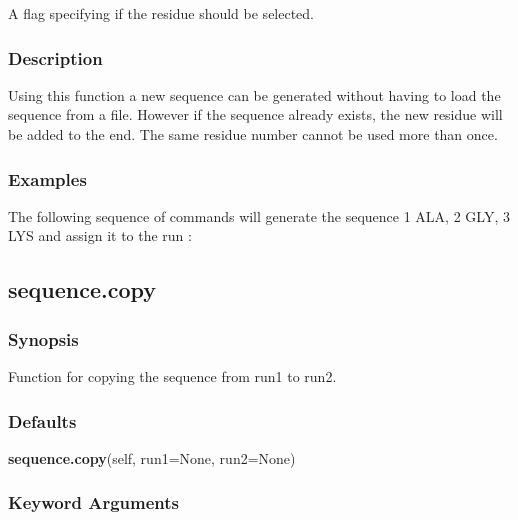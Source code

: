   A flag specifying if the residue should be selected.

\subsubsection{Description}

Using this function a new sequence  can be generated without having to load the sequence  from
a file.  However if the sequence  already exists, the new residue will be added to the end.
The same residue number cannot be used more than once.


\subsubsection{Examples}

The following sequence  of commands will generate the sequence  1 ALA, 2 GLY, 3 LYS and assign
it to the run 
:







\newpage

\subsection{sequence.copy}


\subsubsection{Synopsis}

Function for copying the sequence from run1 to run2.

\subsubsection{Defaults}

\textsf{\textbf{sequence.copy}(self, run1=None, run2=None)}


\subsubsection{Keyword Arguments}


